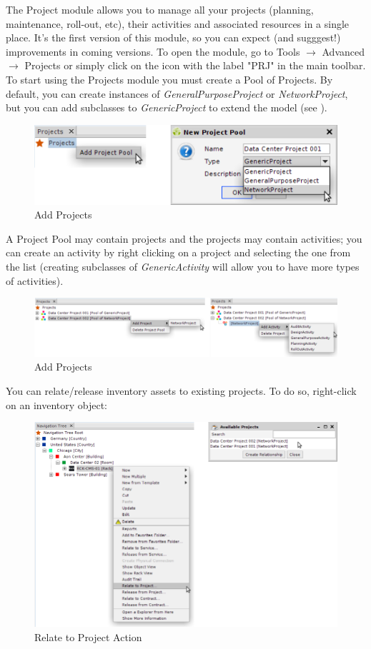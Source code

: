 \documentclass[a4paper]{article}
\begin{document}
			The Project module allows you to manage all your projects (planning, maintenance, roll-out, etc), their activities and associated resources in a single place. It's the first version of this module, so you can expect (and sugggest!) improvements in coming versions. To open the module, go to Tools $\rightarrow$ Advanced $\rightarrow$ Projects or simply click on the icon with the label "PRJ" in the main toolbar.\\
			To start using the Projects module you must create a Pool of Projects. By default, you can create instances of \textit{GeneralPurposeProject} or \textit{NetworkProject}, but you can add subclasses to \textit{GenericProject} to extend the model (see \textbf{}).
		    
		    \begin{figure}[h!]
		    	\centering
		    	\includegraphics[width=0.5\linewidth]{img/projects_new_project_pool.png}
		    	\caption{Add Projects}	    
		    	\label{fig:projects_actions}
		    \end{figure}
		    		    
		    A Project Pool may contain projects and the projects may contain activities; you can create an activity by right clicking on a project and selecting the one from the list (creating subclasses of \textit{GenericActivity} will allow you to have more types of activities).
		    
		    \begin{figure}[h!]
		    	\centering
		    	\includegraphics[width=0.9\linewidth]{img/projects_new_project_activity.png}
		    	\caption{Add Projects}	    
		    	\label{fig:projects_new_project_activity}
		    \end{figure}		    
		    
		    You can relate/release inventory assets to existing projects. To do so, right-click on an inventory object:
		    		    		    
		    \begin{figure}[h!]
		    	\centering
		    	\includegraphics[width=0.6\linewidth]{img/projects_relate_to.png}
		    	\caption{Relate to Project Action}
		    	\label{fig:projects_relate_to}
		    \end{figure}
		    
\end{document}
